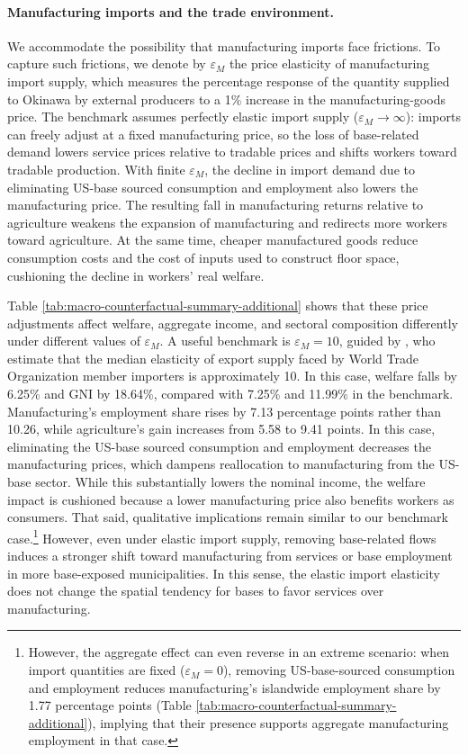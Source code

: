 \documentclass[12pt, unicode, a4paper]{article}
\newcommand{\1}{\mbox{1}\hspace{-0.25em}\mbox{l}} %
\begin{document}
\paragraph{Manufacturing imports and the trade environment.}
We accommodate the possibility that manufacturing imports face frictions.
To capture such frictions, we denote by $\varepsilon_M$ the price elasticity of manufacturing import supply, which measures the percentage response of the quantity supplied to Okinawa by external producers to a 1\% increase in the manufacturing-goods price. The benchmark assumes perfectly elastic import supply ($\varepsilon_M\rightarrow\infty$): imports can freely adjust at a fixed manufacturing price, so the loss of base-related demand lowers service prices relative to tradable prices and shifts workers toward tradable production. With finite $\varepsilon_M$, the decline in import demand due to eliminating US-base sourced consumption and employment also lowers the manufacturing price. The resulting fall in manufacturing returns relative to agriculture weakens the expansion of manufacturing and redirects more workers toward agriculture. At the same time, cheaper manufactured goods reduce consumption costs and the cost of inputs used to construct floor space, cushioning the decline in workers' real welfare.

Table \ref{tab:macro-counterfactual-summary-additional} shows that these price adjustments affect welfare, aggregate income, and sectoral composition differently under different values of $\varepsilon_M$. A useful benchmark is $\varepsilon_M=10$, guided by \citet{nicita2018cooperation}, who estimate that the median elasticity of export supply faced by World Trade Organization member importers is approximately 10.
In this case, welfare falls by 6.25\% and GNI by 18.64\%, compared with 7.25\% and 11.99\% in the benchmark. Manufacturing's employment share rises by 7.13 percentage points rather than 10.26, while agriculture's gain increases from 5.58 to 9.41 points. 
In this case, eliminating the US-base sourced consumption and employment decreases the manufacturing prices, which dampens reallocation to manufacturing from the US-base sector. While this substantially lowers the nominal income, the welfare impact is cushioned because a lower manufacturing price also benefits workers as consumers. That said, qualitative implications remain similar to our benchmark case.\footnote{However, the aggregate effect can even reverse in an extreme scenario: when import quantities are fixed ($\varepsilon_M=0$), removing US-base-sourced consumption and employment reduces manufacturing's islandwide employment share by 1.77 percentage points (Table \ref{tab:macro-counterfactual-summary-additional}), implying that their presence supports aggregate manufacturing employment in that case.} However, even under elastic import supply, removing base-related flows induces a stronger shift toward manufacturing from services or base employment in more base-exposed municipalities. In this sense, the elastic import elasticity does not change the spatial tendency for bases to favor services over manufacturing.
\end{document}
